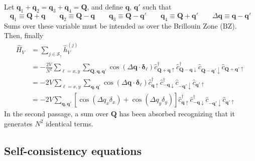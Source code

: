 Let $\mathbf{q}_1 + \mathbf{q}_2 = \mathbf{q}_3 + \mathbf{q}_4 = \mathbf{Q}$, and define $\mathbf{q}$, $\mathbf{q}'$ such that
\[
	\mathbf{q}_1 \equiv \mathbf{Q} + \mathbf{q} 
	\qquad
	\mathbf{q}_2 \equiv \mathbf{Q} - \mathbf{q} 
	\qquad
	\mathbf{q}_3 \equiv \mathbf{Q} - \mathbf{q}' 
	\qquad
	\mathbf{q}_4 \equiv \mathbf{Q} + \mathbf{q}'
	\qquad
	\Delta \mathbf{q} \equiv \mathbf{q}-\mathbf{q}'
\]
Sums over these variable must be intended as over the Brillouin Zone ($\mathrm{BZ}$). Then, finally
\[
\begin{aligned}
	\hat H_V &= \sum_{j \in \mathcal{S}_\uparrow} \hat h_V^{(j)} \\
	&= - \frac{2V}{N^2} \sum_{\ell = x,y} \sum_{\mathbf{Q}, \mathbf{q}, \mathbf{q}'} \cos\left(
		\Delta \mathbf{q} \cdot \bm{\delta}_\ell
	\right)	\hat c_{\mathbf{Q}+\mathbf{q} \uparrow}^\dagger \hat c_{\mathbf{Q}-\mathbf{q} \downarrow}^\dagger \hat c_{\mathbf{Q}-\mathbf{q}' \downarrow} \hat c_{\mathbf{Q}+\mathbf{q}'\uparrow} \\
	&= -2V \sum_{\ell = x,y} \sum_{\mathbf{q}, \mathbf{q}'} \cos\left(
	\Delta \mathbf{q} \cdot \bm{\delta}_\ell
	\right)	\hat c_{\mathbf{q} \uparrow}^\dagger \hat c_{-\mathbf{q} \downarrow}^\dagger \hat c_{-\mathbf{q}' \downarrow} \hat c_{\mathbf{q}'\uparrow} \\
	&= -2V \sum_{\mathbf{q}, \mathbf{q}'} 
	\left[
		\cos \left(
			\Delta q_x \delta_x
		\right)	+ \cos \left(
			\Delta q_y \delta_y
		\right)	
	\right]
	\hat c_{\mathbf{q} \uparrow}^\dagger \hat c_{-\mathbf{q} \downarrow}^\dagger \hat c_{-\mathbf{q}' \downarrow} \hat c_{\mathbf{q}'\uparrow}
\end{aligned}
\]
In the second passage, a sum over $\mathbf{Q}$ has been absorbed recognizing that it generates $N^2$ identical terms. \todo

\subsection{Self-consistency equations}

\todo